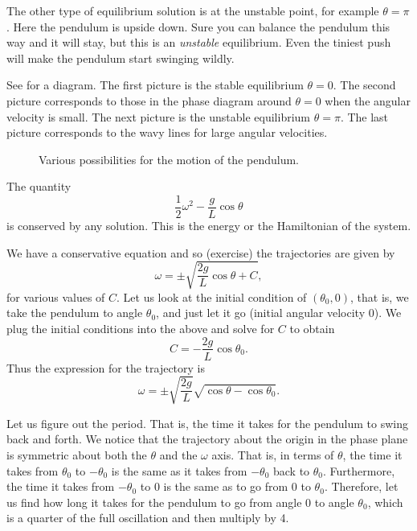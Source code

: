 The other type of equilibrium solution is at the unstable point, for example
$\theta = \pi$.  Here the pendulum is upside down.  Sure you can balance the
pendulum this way and it will stay, but this is an \emph{unstable} equilibrium.
Even the tiniest push will make the pendulum start swinging wildly.

See  for a diagram.  The first picture is the
stable equilibrium $\theta = 0$.  The second picture corresponds to those
 in the phase diagram around $\theta =0$ when the angular
velocity is small.  The next picture is the unstable equilibrium $\theta =
\pi$.  The last picture corresponds to the wavy lines for large angular
velocities.

\begin{figure}[h!t]
\capstart
\begin{center}
\caption{Various possibilities for the motion of the pendulum. \label{fig:nlin-pend}}
\end{center}
\end{figure}

The quantity 
\begin{equation*}
\frac{1}{2} \omega^2  - \frac{g}{L} \cos \theta 
\end{equation*}
is conserved by any solution.  This is the energy or the Hamiltonian of
the system.

We have a conservative equation and so (exercise) the
trajectories are given by
\begin{equation*}
\omega = \pm \sqrt{ \frac{2g}{L} \cos \theta + C} ,
\end{equation*}
for various values of $C$.  
Let us look at the initial condition of $(\theta_0,0)$,
that is, we take the pendulum to
angle $\theta_0$, and just let it go (initial angular velocity 0).
We plug the initial conditions into the above and solve for $C$ to obtain
\begin{equation*}
C = - \frac{2g}{L} \cos \theta_0 .
\end{equation*}
Thus the expression for the trajectory is
\begin{equation*}
\omega = \pm \sqrt{ \frac{2g}{L}} \sqrt{ \cos \theta - \cos \theta_0 } .
\end{equation*}

Let us figure out the period.  That is, the time it takes for the pendulum
to swing back and forth.
We notice that the trajectory about the
origin in the phase plane is symmetric about both the $\theta$ and the
$\omega$ axis.  That is, in terms of $\theta$,
the time it takes from $\theta_0$ to $-\theta_0$
is the same as it takes from $-\theta_0$ back to $\theta_0$.  Furthermore,
the time it takes from $-\theta_0$ to $0$ is the same as to go from $0$ to
$\theta_0$.  Therefore, let us find how long it takes for
the pendulum to go from angle 0 to angle $\theta_0$, which is a quarter of
the full oscillation and then multiply by 4.

